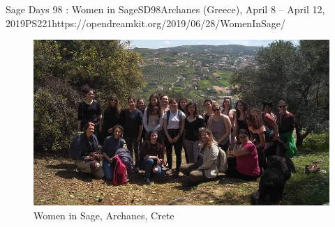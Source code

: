 \begin{event}{Sage Days 98 : Women in Sage}{SD98}{Archanes (Greece), April 8 -- April 12, 2019}{PS}{22}{1}{https://opendreamkit.org/2019/06/28/WomenInSage/}
\begin{figure}[ht]
  \includegraphics[width=.75\textwidth]{group_photo_head.jpeg}
  \caption*{Women in Sage, Archanes, Crete}
\end{figure}



\end{event}
